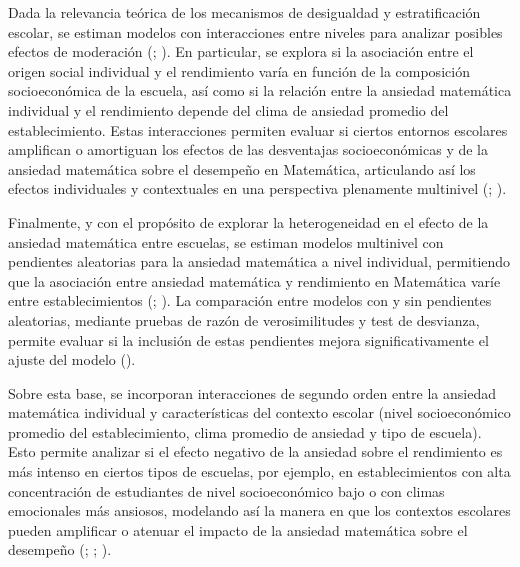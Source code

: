 \documentclass[
  spanish,
  a4paper,
  oneside]{scrbook}
\begin{document}
Dada la relevancia teórica de los mecanismos de desigualdad y
estratificación escolar, se estiman modelos con interacciones entre
niveles para analizar posibles efectos de moderación
(; ). En particular, se explora si la asociación entre el
origen social individual y el rendimiento varía en función de la
composición socioeconómica de la escuela, así como si la relación entre
la ansiedad matemática individual y el rendimiento depende del clima de
ansiedad promedio del establecimiento. Estas interacciones permiten
evaluar si ciertos entornos escolares amplifican o amortiguan los
efectos de las desventajas socioeconómicas y de la ansiedad matemática
sobre el desempeño en Matemática, articulando así los efectos
individuales y contextuales en una perspectiva plenamente multinivel
(;
).

Finalmente, y con el propósito de explorar la heterogeneidad en el
efecto de la ansiedad matemática entre escuelas, se estiman modelos
multinivel con pendientes aleatorias para la ansiedad matemática a nivel
individual, permitiendo que la asociación entre ansiedad matemática y
rendimiento en Matemática varíe entre establecimientos
(;
). La
comparación entre modelos con y sin pendientes aleatorias, mediante
pruebas de razón de verosimilitudes y test de desvianza, permite evaluar
si la inclusión de estas pendientes mejora significativamente el ajuste
del modelo ().

Sobre esta base, se incorporan interacciones de segundo orden entre la
ansiedad matemática individual y características del contexto escolar
(nivel socioeconómico promedio del establecimiento, clima promedio de
ansiedad y tipo de escuela). Esto permite analizar si el efecto negativo
de la ansiedad sobre el rendimiento es más intenso en ciertos tipos de
escuelas, por ejemplo, en establecimientos con alta concentración de
estudiantes de nivel socioeconómico bajo o con climas emocionales más
ansiosos, modelando así la manera en que los contextos escolares pueden
amplificar o atenuar el impacto de la ansiedad matemática sobre el
desempeño (;
;
).
\end{document}

